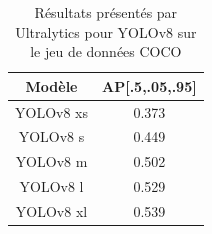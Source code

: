 \begin{table}[!ht]
    \caption{Résultats présentés par Ultralytics pour YOLOv8 sur le jeu de données COCO}
    \label{tab:ultralytics_yolov8_results}
    \centering
    \begin{tabular}{ |c||c|  }
        \hline
        \rowcolor{gray!50}
        Modèle & AP[.5,.05,.95]\\
        \hline
        YOLOv8 xs & 0.373\\
        YOLOv8 s & 0.449\\
        YOLOv8 m & 0.502\\
        YOLOv8 l & 0.529\\
        YOLOv8 xl & 0.539\\
        \hline
    \end{tabular}
\end{table}

\clearpage

